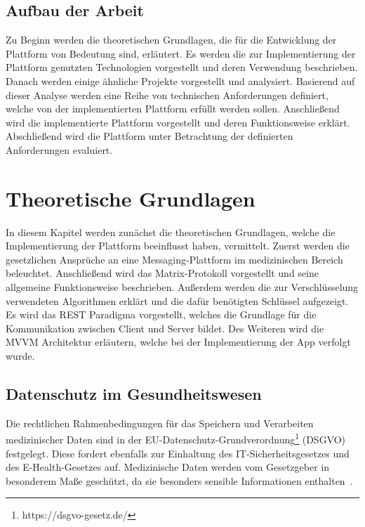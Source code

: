     \section{Aufbau der Arbeit}\label{sec:aufbau-der-arbeit}
    Zu Beginn werden die theoretischen Grundlagen, die für die Entwicklung der Plattform von Bedeutung sind, erläutert.
    Es werden die zur Implementierung der Plattform genutzten Technologien vorgestellt und deren Verwendung beschrieben.
    Danach werden einige ähnliche Projekte vorgestellt und analysiert.
    Basierend auf dieser Analyse werden eine Reihe von technischen Anforderungen definiert, welche von der implementierten Plattform erfüllt werden sollen.
    Anschließend wird die implementierte Plattform vorgestellt und deren Funktionsweise erklärt.
    Abschließend wird die Plattform unter Betrachtung der definierten Anforderungen evaluiert.

    \newpage
    \chapter{Theoretische Grundlagen}\label{ch:theoretische-grundlagen}
    In diesem Kapitel werden zunächst die theoretischen Grundlagen, welche die Implementierung der Plattform beeinflusst haben, vermittelt.
    Zuerst werden die gesetzlichen Ansprüche an eine Messaging-Plattform im medizinischen Bereich beleuchtet.
    Anschließend wird das Matrix-Protokoll vorgestellt und seine allgemeine Funktionsweise beschrieben.
    Außerdem werden die zur Verschlüsselung verwendeten Algorithmen erklärt und die dafür benötigten Schlüssel aufgezeigt.
    Es wird das REST Paradigma vorgestellt, welches die Grundlage für die Kommunikation zwischen Client und Server bildet.
    Des Weiteren wird die MVVM Architektur erläutern, welche bei der Implementierung der App verfolgt wurde.

    \section{Datenschutz im Gesundheitswesen}\label{sec:datenschutz-im-gesundheitswesen}
    Die rechtlichen Rahmenbedingungen für das Speichern und Verarbeiten medizinischer Daten sind in der EU-Datenschutz-Grundverordnung\footnote{https://dsgvo-gesetz.de/} (DSGVO) festgelegt.
    Diese fordert ebenfalls zur Einhaltung des IT-Sicherheitsgesetzes und des E-Health-Gesetzes auf.
    Medizinische Daten werden vom Gesetzgeber in besonderem Maße geschützt, da sie besonders sensible Informationen enthalten~\cite{datenschutzimgesundeitswesen}.

